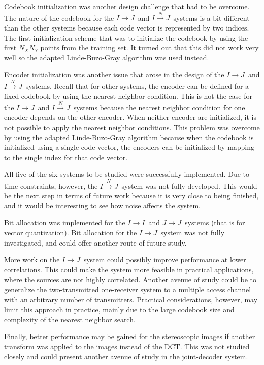\documentclass[10pt,twoside,titlepage]{article}
\newcommand{\sysII}{\mbox{$I \rightarrow I$}}
\newcommand{\sysIJN}{\mbox{$I \overset{N}{\rightarrow} J$}}
\newcommand{\sysIJ}{\mbox{$I \rightarrow J$}}
\newcommand{\sysJJ}{\mbox{$J \rightarrow J$}}
\begin{document}
Codebook initialization was another design challenge that had to be overcome. The nature of the codebook for the \sysIJ\ and \sysIJN\ systems is a bit different than the other systems because each code vector is represented by two indices. The first initialization scheme that was to initialize the codebook by using the first $N_XN_Y$ points from the training set. It turned out that this did not work very well so the adapted Linde-Buzo-Gray algorithm was used instead.

Encoder initialization was another issue that arose in the design of the \sysIJ\ and \sysIJN\ systems. Recall that for other systems, the encoder can be defined for a fixed codebook by using the nearest neighbor condition. This is not the case for the \sysIJ\ and \sysIJN\ systems because the nearest neighbor condition for one encoder depends on the other encoder. When neither encoder are initialized, it is not possible to apply the nearest neighbor conditions. This problem was overcome by using the adapted Linde-Buzo-Gray algorithm because when the codebook is initialized using a single code vector, the encoders can be initialized by mapping to the single index for that code vector.

All five of the six systems to be studied were successfully implemented. Due to time constraints, however, the \sysIJN\ system was not fully developed. This would be the next step in terms of future work because it is very close to being finished, and it would be interesting to see how noise affects the system. 

Bit allocation was implemented for the \sysII\ and \sysJJ\ systems (that is for vector quantization). Bit allocation for the \sysIJ\ system was not fully investigated, and could offer another route of future study.

More work on the \sysIJ\ system could possibly improve performance at lower correlations. This could make the system more feasible in practical applications, where the sources are not highly correlated. Another avenue of study could be to generalize the two-transmitted one-receiver system to a multiple access channel with an arbitrary number of transmitters. Practical considerations, however, may limit this approach in practice, mainly due to the large codebook size and complexity of the nearest neighbor search.

Finally, better performance may be gained for the stereoscopic images if another transform was applied to the images instead of the DCT. This was not studied closely and could present another avenue of study in the joint-decoder system.
\end{document}
